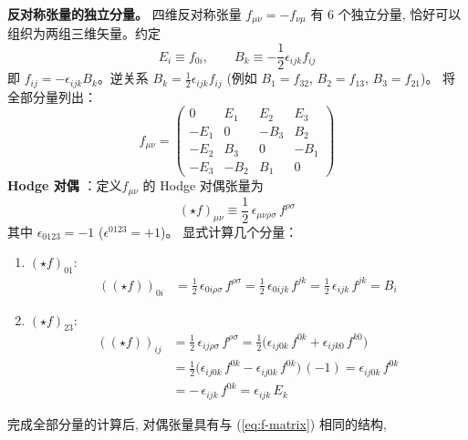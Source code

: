 \textbf{反对称张量的独立分量。}
四维反对称张量 $f_{\mu\nu}=-f_{\nu\mu}$ 有 6 个独立分量, 
恰好可以组织为两组三维矢量。约定
\begin{equation}
    E_i \equiv f_{0i}, \qquad B_k \equiv -\frac{1}{2}\epsilon_{ijk}f_{ij}
    \label{eq:EB-def}
\end{equation}
即 $f_{ij} = -\epsilon_{ijk}B_k$。逆关系 $B_k = \frac{1}{2}\epsilon_{ijk}f_{ij}$ 
(例如 $B_1 = f_{32}$, $B_2 = f_{13}$, $B_3 = f_{21}$)。
将全部分量列出：
\begin{equation}
    f_{\mu\nu} = \begin{pmatrix}
    0 & E_1 & E_2 & E_3 \\
    -E_1 & 0 & -B_3 & B_2 \\
    -E_2 & B_3 & 0 & -B_1 \\
    -E_3 & -B_2 & B_1 & 0
    \end{pmatrix}
    \label{eq:f-matrix}
\end{equation}
\textbf{Hodge 对偶} ：定义$f_{\mu\nu}$ 的 Hodge 对偶张量为
\begin{equation}
    (\star f)_{\mu\nu} \equiv \frac{1}{2}\,\epsilon_{\mu\nu\rho\sigma}\,f^{\rho\sigma}
    \label{eq:hodge-def}
\end{equation}
其中 $\epsilon_{0123}=-1$ ($\epsilon^{0123}=+1$)。
显式计算几个分量：
\begin{enumerate}
    \item $(\star f)_{01}$:
        \[
            \begin{aligned}
            ((\star f))_{0i}
                &= \frac{1}{2}\,\epsilon_{0i\rho\sigma}\,f^{\rho\sigma} = \frac{1}{2}\,\epsilon_{0ijk}\,f^{jk} = \frac{1}{2}\,\epsilon_{ijk}\,f^{jk} = B_i
            \end{aligned}
        \]
    \item   $(\star f)_{23}$:
        \[
                \begin{aligned}
                ((\star f))_{ij}
                &= \frac{1}{2}\,\epsilon_{ij\rho\sigma}\,f^{\rho\sigma} = \frac{1}{2}\bigl(\epsilon_{ij0k}\,f^{0k} + \epsilon_{ijk0}\,f^{k0}\bigr) \\
                &= \frac{1}{2}\bigl(\epsilon_{ij0k}\,f^{0k} - \epsilon_{ij0k}\,f^{0k}\bigr)\,(-1) = \epsilon_{ij0k}\,f^{0k} \\
                &= -\,\epsilon_{ijk}\,f^{0k} = \epsilon_{ijk}\,E_k
            \end{aligned}
        \]
\end{enumerate}
完成全部分量的计算后, 对偶张量具有与 (\ref{eq:f-matrix}) 相同的结构, 
